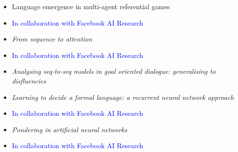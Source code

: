 {{{{{
{\begin{itemize}
  \item[] Language emergence in multi-agent referential games
  \item[] \textcolor{blue}{\normalfont In collaboration with Facebook AI Research\vspace{1mm}}
\end{itemize}
}

{
{\begin{itemize}
  \item[] \textit{From sequence to attention}
  \item[] \textcolor{blue}{\normalfont In collaboration with Facebook AI Research\vspace{1mm}}
\end{itemize}
}

{
{\begin{itemize}
  \item[] \textit{Analysing seq-to-seq models in goal oriented dialogue: generalising to disfluencies}
\end{itemize}
}

{
{\begin{itemize}
  \item[] \textit{Learning to decide a formal language: a recurrent neural network approach}
  \item[] \textcolor{blue}{\normalfont In collaboration with Facebook AI Research\vspace{1mm}}
\end{itemize}
}

{
{\begin{itemize}
  \item[] \textit{Pondering in artificial neural networks}
  \item[] \textcolor{blue}{\normalfont In collaboration with Facebook AI Research\vspace{1mm}}
\end{itemize}}}

}}}}}}}}
